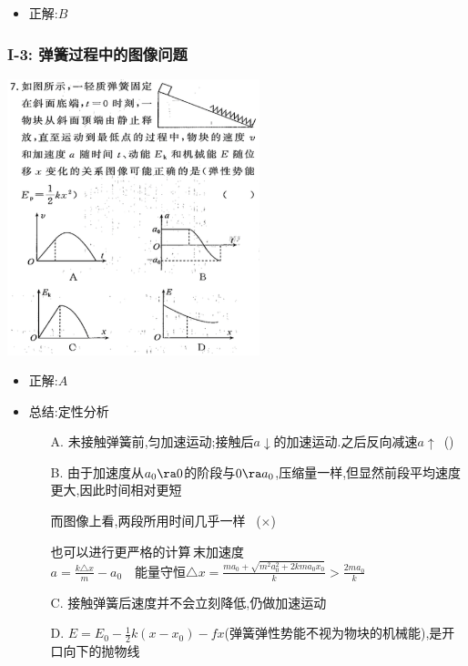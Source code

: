 \documentclass{article}
\begin{document}
\begin{itemize}
    \item 正解:\quad $B$
\end{itemize}

\vspace{2em}

\subsubsection{I-3: 弹簧过程中的图像问题}
\includegraphics[width=0.55\textwidth,keepaspectratio]{./pictures/3.12-3.png}

\begin{itemize}
    \item 正解:\quad $A$
    \item 总结:\quad 定性分析
    
    \begin{minipage}{0.88\textwidth}
        \begin{enumerate}
            \item[A.] 未接触弹簧前,匀加速运动;接触后$a \downarrow$的加速运动.之后反向减速$a \uparrow \,$ (\checkmark)
            \item[B.] 由于加速度从$a_{0} \ra 0$的阶段与$0 \ra a_{0}$,压缩量一样,但显然前段平均速度更大,因此时间相对更短
            
            而图像上看,两段所用时间几乎一样 \, ($\boldsymbol{\times}$)

            也可以进行更严格的计算\,末加速度$a = \frac{k \triangle x }{m} - a_{0} \quad \text{能量守恒} \triangle x = \frac{ma_{0} + \sqrt{m^{2}a_{0}^{2} + 2kma_{0}x_{0}}}{k} > \frac{2ma_{0}}{k}$

            \item[C.] 接触弹簧后速度并不会立刻降低,仍做加速运动
            \item[D.] $E = E_{0} - \frac{1}{2} k (x-x_{0}) - fx$(弹簧弹性势能不视为物块的机械能),是开口向下的抛物线 
        \end{enumerate}
        
    \end{minipage}
\end{itemize}
\end{document}

